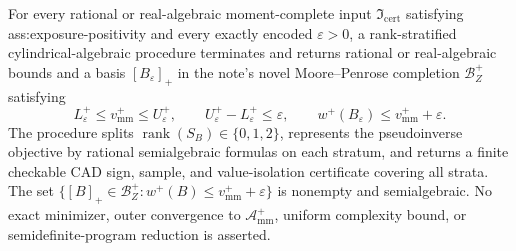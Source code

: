 For every rational or real-algebraic moment-complete input \(\mathfrak I_{\mathrm{cert}}\) satisfying ass:exposure-positivity and every exactly encoded \(\varepsilon>0\), a rank-stratified cylindrical-algebraic procedure terminates and returns rational or real-algebraic bounds and a basis \([B_\varepsilon]_+\) in the note's novel Moore--Penrose completion \(\mathcal B_Z^+\) satisfying
\[
L_\varepsilon^+\le v_{\mathrm{mm}}^+\le U_\varepsilon^+,
\qquad U_\varepsilon^+-L_\varepsilon^+\le\varepsilon,
\qquad w^+(B_\varepsilon)\le v_{\mathrm{mm}}^++\varepsilon.
\]
The procedure splits \(\operatorname{rank}(S_B)\in\{0,1,2\}\), represents the pseudoinverse objective by rational semialgebraic formulas on each stratum, and returns a finite checkable CAD sign, sample, and value-isolation certificate covering all strata.  The set \(\{[B]_+\in\mathcal B_Z^+:w^+(B)\le v_{\mathrm{mm}}^++\varepsilon\}\) is nonempty and semialgebraic.  No exact minimizer, outer convergence to \(\mathcal A_{\mathrm{mm}}^+\), uniform complexity bound, or semidefinite-program reduction is asserted.